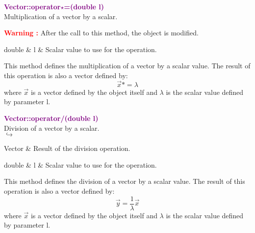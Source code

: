 \textcolor{purple}{\textbf{Vector::operator$\star$=(double l)}}\label{Vector::operator*=(double l)}\\
Multiplication of a vector by a scalar.

\hspace*{10mm}\textcolor{red}{\textbf{Warning :}} After the call to this method, the object is modified.

\begin{tcolorbox}[width=\textwidth,myArgs,tabularx={ll|R}]
double & l & Scalar value to use for the operation.
\end{tcolorbox}

This method defines the multiplication of a vector by a scalar value.
The result of this operation is also a vector defined by:
\begin{equation*}
\overrightarrow{x} *= \lambda
\end{equation*}
where $\overrightarrow{x}$ is a vector defined by the object itself and $\lambda$ is the scalar value defined by parameter l.

\textcolor{purple}{\textbf{Vector::operator/(double l)}}\label{Vector::operator/(double l)}\\
Division of a vector by a scalar.\\ \hspace*{5mm}$\hookrightarrow$
\vspace*{-2em}\begin{tcolorbox}[grow to left by=-1cm, width=\textwidth-1cm,myArgs,tabularx={l|R}]
Vector & Result of the division operation.
\end{tcolorbox}

\begin{tcolorbox}[width=\textwidth,myArgs,tabularx={ll|R}]
double & l & Scalar value to use for the operation.
\end{tcolorbox}

This method defines the division of a vector by a scalar value.
The result of this operation is also a vector defined by:
\begin{equation*}
\overrightarrow{y} = \frac{1}{\lambda} \overrightarrow{x}
\end{equation*}
where $\overrightarrow{x}$ is a vector defined by the object itself and $\lambda$ is the scalar value defined by parameter l.

